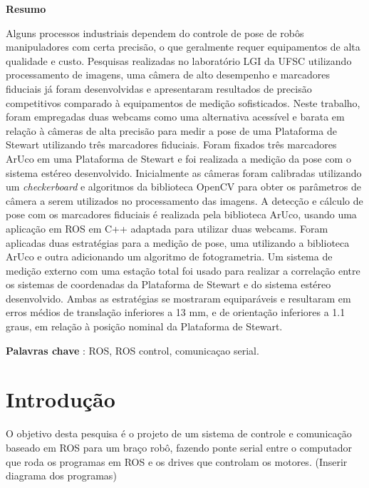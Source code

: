 \documentclass[12pt,a4paper,oneside,english, brazil]{abntex2}
\begin{document}



\textbf{Resumo}

Alguns processos industriais dependem do controle de pose de robôs manipuladores com certa precisão, o que geralmente requer equipamentos de alta qualidade e custo. Pesquisas realizadas no laboratório LGI da UFSC utilizando processamento de imagens, uma câmera de alto desempenho e marcadores fiduciais já foram desenvolvidas e apresentaram resultados de precisão competitivos comparado à equipamentos de medição sofisticados. Neste trabalho, foram empregadas duas webcams como uma alternativa acessível e barata em relação à câmeras de alta precisão para medir a pose de uma Plataforma de Stewart utilizando três marcadores fiduciais. Foram fixados três marcadores ArUco em uma Plataforma de Stewart e foi realizada a medição da pose com o sistema estéreo desenvolvido. Inicialmente as câmeras foram calibradas utilizando um \textit{checkerboard} e algoritmos da biblioteca OpenCV para obter os parâmetros de câmera a serem utilizados no processamento das imagens. A detecção e cálculo de pose com os marcadores fiduciais é realizada pela biblioteca ArUco, usando uma aplicação em ROS em C++ adaptada para utilizar duas webcams. Foram aplicadas duas estratégias para a medição de pose, uma utilizando a biblioteca ArUco e outra adicionando um algoritmo de fotogrametria. Um sistema de medição externo com uma estação total foi usado para realizar a correlação entre os sistemas de coordenadas da Plataforma de Stewart e do sistema estéreo desenvolvido. Ambas as estratégias se mostraram equiparáveis e resultaram em erros médios de translação inferiores a 13 mm, e de orientação inferiores a 1.1 graus, em relação à posição nominal da Plataforma de Stewart.

 \textbf{Palavras chave} : ROS, ROS control, comunicaçao serial.




\chapter{Introdução}

O objetivo desta pesquisa é o projeto de um sistema de controle e comunicação baseado em ROS para um braço robô, fazendo ponte serial entre o computador que roda os programas em ROS e os drives que controlam os motores. (Inserir diagrama dos programas)
\end{document}
